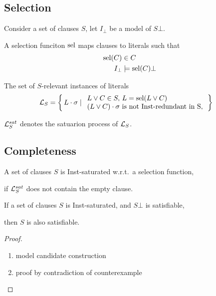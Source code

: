 \documentclass[%
handout,
]{beamer}
\begin{document}
\subsection{Selection}
\begin{frame}
    Consider a set of clauses $S$, let $I_\bot$ be a model of $S\bot$.

    A selection funciton $\operatorname{sel}$ maps clauses to literals such that
    \begin{align*}
        \operatorname{sel}(C)&\in C
        \\
        I_\bot&\models\operatorname{sel}(C)\bot
    \end{align*}



    The set of $S$-relevant instances of literals
    \begin{align*}
        \mathcal{L}_S &= \left\{\, L\cdot\sigma \mid
        \begin{array}{l}
            L\lor C\in S,\,L = \operatorname{sel}(L\lor C)\\
            (L\lor C)\cdot\sigma\text{ is not Inst-redundant in S},\\
        \end{array}
        \,\right\}
    \end{align*}

    \vspace{1.4em}
    $\mathcal{L}_S^{sat}$ denotes the satuarion process of $\mathcal{L}_S$.

    \vspace{0.7em}


\end{frame}

\subsection{Completeness}
\begin{frame}
    A set of clauses $S$ is Inst-saturated w.r.t.~a selection function,

    if $\mathcal{L}_S^{sat}$ does not contain the empty clause.
    \vspace{1.4em}

    \begin{theorem}
    If a set of clauses $S$ is Inst-saturated,
    and $S\bot$ is satisfiable,

    then $S$ is also satisfiable.
    \end{theorem}
    \vspace{1.4em}

    \begin{proof}
        \begin{enumerate}
            \item model candidate construction
            \item proof by contradiction of counterexample
        \end{enumerate}
        \end{proof}
\end{frame}
\end{document}
